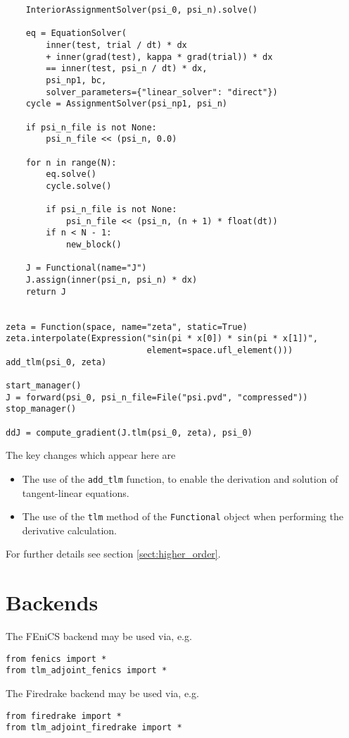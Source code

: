 \documentclass[11pt]{article}
\begin{document}
\begin{lstlisting}
    InteriorAssignmentSolver(psi_0, psi_n).solve()

    eq = EquationSolver(
        inner(test, trial / dt) * dx
        + inner(grad(test), kappa * grad(trial)) * dx
        == inner(test, psi_n / dt) * dx,
        psi_np1, bc,
        solver_parameters={"linear_solver": "direct"})
    cycle = AssignmentSolver(psi_np1, psi_n)

    if psi_n_file is not None:
        psi_n_file << (psi_n, 0.0)

    for n in range(N):
        eq.solve()
        cycle.solve()

        if psi_n_file is not None:
            psi_n_file << (psi_n, (n + 1) * float(dt))
        if n < N - 1:
            new_block()

    J = Functional(name="J")
    J.assign(inner(psi_n, psi_n) * dx)
    return J


zeta = Function(space, name="zeta", static=True)
zeta.interpolate(Expression("sin(pi * x[0]) * sin(pi * x[1])",
                            element=space.ufl_element()))
add_tlm(psi_0, zeta)

start_manager()
J = forward(psi_0, psi_n_file=File("psi.pvd", "compressed"))
stop_manager()

ddJ = compute_gradient(J.tlm(psi_0, zeta), psi_0)
\end{lstlisting}

The key changes which appear here are
\begin{itemize}
  \item The use of the \texttt{add\_tlm} function, to enable the derivation and
    solution of tangent-linear equations. 
  \item The use of the \texttt{tlm} method of the \texttt{Functional} object
    when performing the derivative calculation.
\end{itemize}
For further details see section \ref{sect:higher_order}.

\section{Backends}\label{sect:backends}

The FEniCS backend may be used via, e.g.
\begin{lstlisting}
from fenics import *
from tlm_adjoint_fenics import *
\end{lstlisting}

The Firedrake backend may be used via, e.g.
\begin{lstlisting}
from firedrake import *
from tlm_adjoint_firedrake import *
\end{lstlisting}
\end{document}
